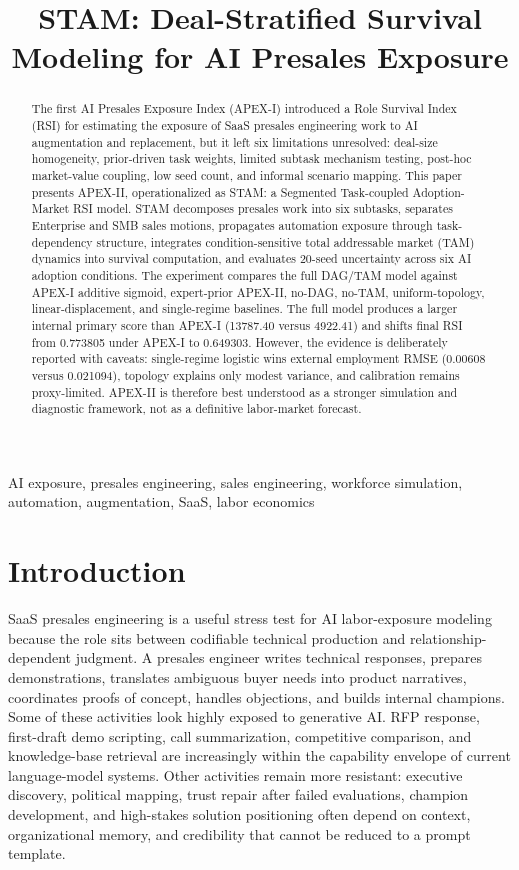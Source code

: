\documentclass[10pt,conference]{IEEEtran}
\title{STAM: Deal-Stratified Survival Modeling for AI Presales Exposure}
\author{\IEEEauthorblockN{Akash Anipakalu Giridhar}}
\begin{document}
\maketitle

\begin{abstract}
The first AI Presales Exposure Index (APEX-I) introduced a Role Survival Index (RSI) for estimating the exposure of SaaS presales engineering work to AI augmentation and replacement, but it left six limitations unresolved: deal-size homogeneity, prior-driven task weights, limited subtask mechanism testing, post-hoc market-value coupling, low seed count, and informal scenario mapping. This paper presents APEX-II, operationalized as STAM: a Segmented Task-coupled Adoption-Market RSI model. STAM decomposes presales work into six subtasks, separates Enterprise and SMB sales motions, propagates automation exposure through task-dependency structure, integrates condition-sensitive total addressable market (TAM) dynamics into survival computation, and evaluates 20-seed uncertainty across six AI adoption conditions. The experiment compares the full DAG/TAM model against APEX-I additive sigmoid, expert-prior APEX-II, no-DAG, no-TAM, uniform-topology, linear-displacement, and single-regime baselines. The full model produces a larger internal primary score than APEX-I (13787.40 versus 4922.41) and shifts final RSI from 0.773805 under APEX-I to 0.649303. However, the evidence is deliberately reported with caveats: single-regime logistic wins external employment RMSE (0.00608 versus 0.021094), topology explains only modest variance, and calibration remains proxy-limited. APEX-II is therefore best understood as a stronger simulation and diagnostic framework, not as a definitive labor-market forecast.
\end{abstract}

\begin{IEEEkeywords}
AI exposure, presales engineering, sales engineering, workforce simulation, automation, augmentation, SaaS, labor economics
\end{IEEEkeywords}

\section{Introduction}
SaaS presales engineering is a useful stress test for AI labor-exposure modeling because the role sits between codifiable technical production and relationship-dependent judgment. A presales engineer writes technical responses, prepares demonstrations, translates ambiguous buyer needs into product narratives, coordinates proofs of concept, handles objections, and builds internal champions. Some of these activities look highly exposed to generative AI. RFP response, first-draft demo scripting, call summarization, competitive comparison, and knowledge-base retrieval are increasingly within the capability envelope of current language-model systems. Other activities remain more resistant: executive discovery, political mapping, trust repair after failed evaluations, champion development, and high-stakes solution positioning often depend on context, organizational memory, and credibility that cannot be reduced to a prompt template.
\end{document}
